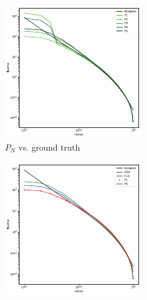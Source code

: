 \begin{figure}[h]
\centering
\begin{subfigure}{0.45\columnwidth}
\includegraphics[width=\columnwidth]{figures/pointsource_pn.pdf}
\caption{$P_N$ vs. ground truth}
\label{fig:pointsource_pn}
\end{subfigure}%
\hspace{0.05\columnwidth}
\begin{subfigure}{0.45\columnwidth}
\includegraphics[width=\columnwidth]{figures/pointsource_p5.pdf}

\end{subfigure}
\end{figure}
